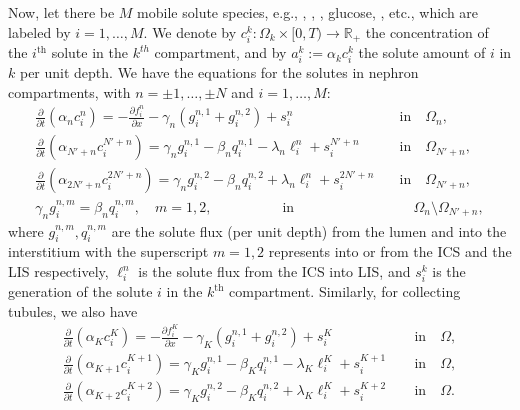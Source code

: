 \documentclass{article}
\begin{document}
Now, let there be $M$ mobile solute species, e.g., , , , glucose, , etc., which are labeled by $i=1,\dots,M$.
We denote by $c_i^k:\Omega_k\times [0,T)\to \mathbb{R}_+$ the concentration of the $i^{\mathrm{th}}$ solute in the $k^{th}$ compartment, and by $a_i^k:=\alpha_kc_i^k$ the solute amount of $i$ in $k$ per unit depth.
We have the equations for the solutes in nephron compartments, with $n=\pm 1,\dots,\pm N$ and $i=1,\dots,M$:
\begin{align}
    \frac{\partial }{\partial t}(\alpha_nc_i^n) = -\frac{\partial f_i^n}{\partial x}-\gamma_n(g_i^{n,1}+g_i^{n,2})+s_i^{n} \qquad \ &\text{in}\quad \Omega_{n},\\
    \frac{\partial }{\partial t}(\alpha_{N'+n}c_i^{N'+n}) = \gamma_{n}g_i^{n,1}-\beta_nq_i^{n,1}-\lambda_n\ell_i^n+s_i^{N'+n} \quad \ &\text{in}\quad \Omega_{N'+n},\\
    \frac{\partial }{\partial t}(\alpha_{2N'+n} c_i^{2N'+n}) = \gamma_{n}g_i^{n,2}-\beta_nq_i^{n,2}+\lambda_n\ell_i^n+s_i^{2N'+n}\quad &\text{in}\quad \Omega_{N'+n},\\
    \gamma_ng_i^{n,m} = \beta_nq_i^{n,m},\quad m=1,2, \qquad \qquad \quad \text{in}&\quad \Omega_n\setminus\Omega_{N'+n},
\end{align}
    where $g_i^{n,m},q_i^{n,m}$ are the solute flux (per unit depth) from the lumen and into the interstitium with the superscript $m=1,2$ represents into or from the ICS and the LIS respectively, $\ell_i^n$ is the solute flux from the ICS into LIS, and $s_i^{k}$ is the generation of the solute $i$ in the $k^{\mathrm{th}}$ compartment.
Similarly, for collecting tubules, we also have
\begin{align}
    \frac{\partial }{\partial t}(\alpha_Kc_i^K) = -\frac{\partial f_i^K}{\partial x}-\gamma_K(g_i^{n,1}+g_i^{n,2})+s_i^K \qquad \ &\text{in}\quad \Omega,\\
    \frac{\partial }{\partial t}(\alpha_{K+1}c_i^{K+1}) = \gamma_Kg_i^{n,1}-\beta_Kq_i^{n,1}-\lambda_K\ell_i^K+s_i^{K+1} \quad \ &\text{in}\quad \Omega,\\
    \frac{\partial }{\partial t}(\alpha_{K+2} c_i^{K+2}) = \gamma_Kg_i^{n,2}-\beta_Kq_i^{n,2}+\lambda_K\ell_i^K+s_i^{K+2}\quad &\text{in}\quad \Omega.
\end{align}
\end{document}

